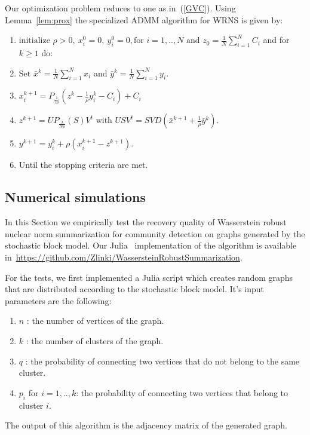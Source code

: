 \documentclass[12pt]{amsart}
\theoremstyle{remark}
\begin{document}
Our optimization problem reduces to one as in~(\ref{GVC}). Using Lemma~\ref{lem:prox} the specialized ADMM algorithm for WRNS is given by:

\begin{enumerate}
\item $\text{initialize } \rho >0, \  x_i^0=0, \  y_i^0=0, \text{for } i=1,..,N \text{ and } z_0= \frac{1}{N}\sum_{i=1}^N C_i$ and for $k\geq 1$ do:
\item $ \text{Set } \bar{x}^{k} = \frac{1}{N}\sum_{i=1}^N x_i $ and $\bar{y}^{k} = \frac{1}{N}\sum_{i=1}^N y_i $.
\item $x_i^{k+1}=P_{\frac{1}{2\rho}}(z^k-\frac{1}{\rho}y_i^k-C_i)+C_i$
\item $z^{k+1} = UP_{\frac{\lambda}{N\rho}}(S)V^t$ with $USV^t = SVD(\bar{x}^{k+1}+\frac{1}{\rho}\bar{y}^k)$.
\item $y^{k+1} =y_i^k + \rho(x_i^{k+1}-z^{k+1}). $ 
\item Until the stopping criteria are met.
\end{enumerate}




\subsection{Numerical simulations}
\label{Numerics}
In this Section we empirically test the recovery quality of Wasserstein robust nuclear norm summarization for community detection on graphs generated by the stochastic block model. 
Our Julia~\cite{Julia} implementation of the algorithm is available in~\url{https://github.com/Zlinki/WassersteinRobustSummarization}.

For the tests, we first implemented a Julia script which creates random graphs that are distributed according to the stochastic block model. It's input parameters are the following:
\begin{enumerate}
\item $n$ : the number of vertices of the graph.
\item $k$ : the number of clusters of the graph.
\item $q$ : the probability of connecting two vertices that do not belong to the same cluster.
\item $p_i$ for $i=1,..,k$: the probability of connecting two vertices that belong to cluster $i$.
\end{enumerate}
The output of this algorithm is the adjacency matrix of the generated graph. 
\end{document}
